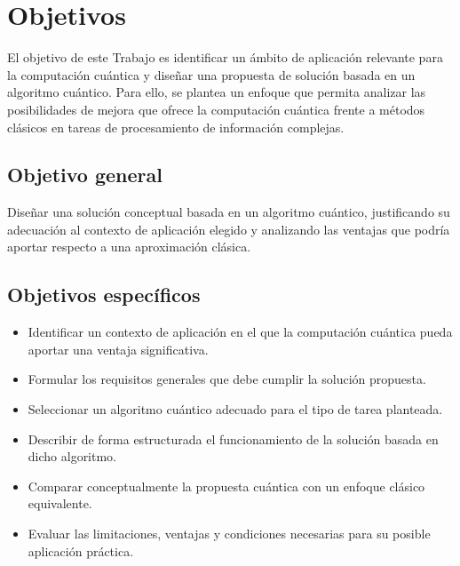 \chapter{Objetivos}

El objetivo de este Trabajo es identificar un ámbito de aplicación relevante para la computación cuántica y diseñar una propuesta de solución basada en un algoritmo cuántico. Para ello, se plantea un enfoque que permita analizar las posibilidades de mejora que ofrece la computación cuántica frente a métodos clásicos en tareas de procesamiento de información complejas.

\section{Objetivo general}

Diseñar una solución conceptual basada en un algoritmo cuántico, justificando su adecuación al contexto de aplicación elegido y analizando las ventajas que podría aportar respecto a una aproximación clásica.

\section{Objetivos específicos}

\begin{itemize}
	\item Identificar un contexto de aplicación en el que la computación cuántica pueda aportar una ventaja significativa.
	\item Formular los requisitos generales que debe cumplir la solución propuesta.
	\item Seleccionar un algoritmo cuántico adecuado para el tipo de tarea planteada.
	\item Describir de forma estructurada el funcionamiento de la solución basada en dicho algoritmo.
	\item Comparar conceptualmente la propuesta cuántica con un enfoque clásico equivalente.
	\item Evaluar las limitaciones, ventajas y condiciones necesarias para su posible aplicación práctica.
\end{itemize}
